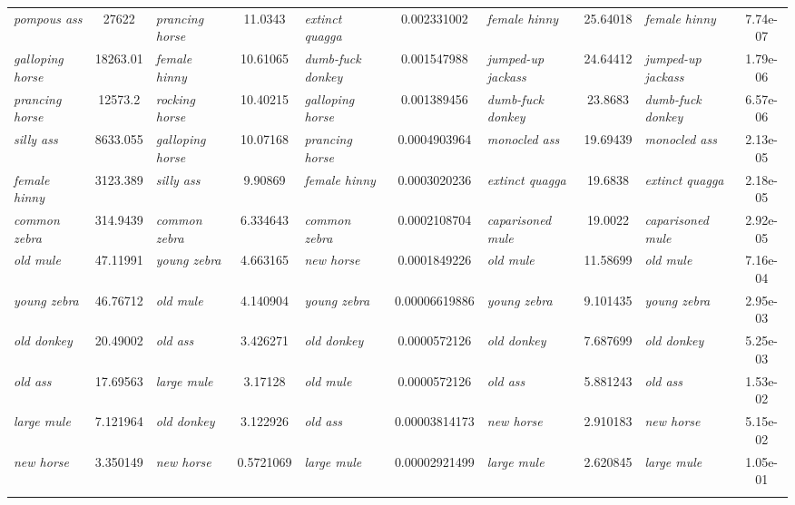 \begin{sidewaystable}
{\begin{tabular}[t]{lS[table-format=5.2]lS[table-format=2.2]lS[table-format=1.6,round-mode=places,round-precision=6]lS[table-format=3.2]lS[table-format=1.2e-3]}
\textit{pompous ass} & 27622 & \textit{prancing horse}                       & 11.0343 & \textit{extinct quagga} &          0.002331002 & \textit{female hinny}    & 25.64018 & \textit{female hinny} & 7.74e-07 \\
\textit{galloping horse} & 18263.01 & \textit{female hinny}                  & 10.61065 & \textit{dumb\hyp{}fuck donkey} &  0.001547988 & \textit{jumped\hyp{}up jackass} & 24.64412 & \textit{jumped\hyp{}up jackass} & 1.79e-06 \\
\textit{prancing horse} & 12573.2 & \textit{rocking horse}                   & 10.40215 & \textit{galloping horse} &        0.001389456 & \textit{dumb\hyp{}fuck donkey} &  23.8683 & \textit{dumb\hyp{}fuck donkey} & 6.57e-06 \\
\textit{silly ass} & 8633.055 & \textit{galloping horse}                     & 10.07168 & \textit{prancing horse} &         0.0004903964 & \textit{monocled ass} &     19.69439 & \textit{monocled ass} & 2.13e-05 \\
\textit{female hinny} & 3123.389 & \textit{silly ass}                        & 9.90869 & \textit{female hinny} &            0.0003020236 & \textit{extinct quagga} &   19.6838 & \textit{extinct quagga} & 2.18e-05 \\
\textit{common zebra} & 314.9439 & \textit{common zebra}                     & 6.334643 & \textit{common zebra} &           0.0002108704 & \textit{caparisoned mule} & 19.0022 & \textit{caparisoned mule} & 2.92e-05 \\
\textit{old mule} & 47.11991 & \textit{young zebra}                          & 4.663165 & \textit{new horse} &              0.0001849226 & \textit{old mule} &     11.58699 & \textit{old mule} & 7.16e-04 \\
\textit{young zebra} & 46.76712 & \textit{old mule}                          & 4.140904 & \textit{young zebra} &            0.00006619886 & \textit{young zebra} & 9.101435 & \textit{young zebra} & 2.95e-03 \\
\textit{old donkey} & 20.49002 & \textit{old ass}                            & 3.426271 & \textit{old donkey} &             0.0000572126 & \textit{old donkey} &   7.687699 & \textit{old donkey} & 5.25e-03 \\
\textit{old ass} & 17.69563 & \textit{large mule}                            & 3.17128 & \textit{old mule} &                0.0000572126 & \textit{old ass} &      5.881243 & \textit{old ass} & 1.53e-02 \\
\textit{large mule} & 7.121964 & \textit{old donkey}                         & 3.122926 & \textit{old ass} &                0.00003814173 & \textit{new horse} &   2.910183 & \textit{new horse} & 5.15e-02 \\
\textit{new horse} & 3.350149 & \textit{new horse}                           & 0.5721069 & \textit{large mule} &            0.00002921499 & \textit{large mule} &  2.620845 & \textit{large mule} & 1.05e-01 \\
\lspbottomrule
\end{tabular}}
\end{sidewaystable}

